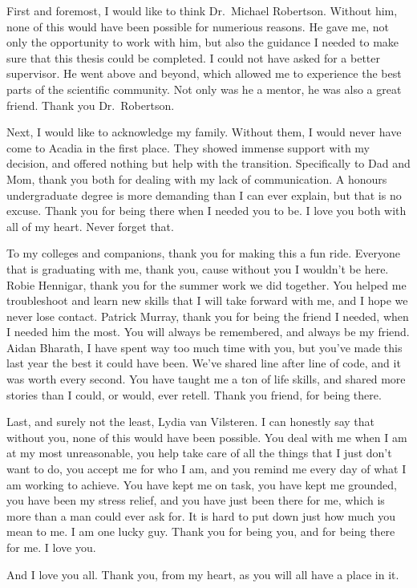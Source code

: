 \newpage
	

    First and foremost, I would like to think Dr.\ Michael Robertson. Without him, 
    none of this would have been possible for numerious reasons. He gave me, not 
    only the opportunity to work with him, but also the guidance I needed to make 
    sure that this thesis could be completed. I could not have asked for a better
    supervisor. He went above and beyond, which allowed me to experience the best parts
    of the scientific community. Not only was he a mentor, he was also a great friend.
    Thank you Dr.\ Robertson.

    Next, I would like to acknowledge my family. Without them, I would never have come to
    Acadia in the first place. They showed immense support with my decision, and offered
    nothing but help with the transition. Specifically to Dad and Mom, thank you both for
    dealing with my lack of communication. A honours undergraduate degree is more demanding
    than I can ever explain, but that is no excuse. Thank you for being there when I needed
    you to be. I love you both with all of my heart. Never forget that.

    To my colleges and companions, thank you for making this a fun ride. Everyone that is
    graduating with me, thank you, cause without you I wouldn't be here.
    Robie Hennigar, thank you for the summer work we did together. You helped me troubleshoot
    and learn new skills that I will take forward with me, and I hope we never lose contact.
    Patrick Murray, thank you for being the friend I needed, when I needed him the most. You
    will always be remembered, and always be my friend.
    Aidan Bharath, I have spent way too much time with you, but you've made this last year
    the best it could have been. We've shared line after line of code, and it was worth 
    every second. You have taught me a ton of life skills, and shared more stories than
    I could, or would, ever retell. Thank you friend, for being there.

    Last, and surely not the least, Lydia van Vilsteren. I can honestly say that without
    you, none of this would have been possible. You deal with me when I am at my most
    unreasonable, you help take care of all the things that I just don't want to do,
    you accept me for who I am,
    and you remind me every day of what I am working to achieve. You have kept me on task,
    you have kept me grounded,
    you have been my stress relief, and you have just been there for me, which is more than
    a man could ever ask for. It is hard to put down just how much you mean to me.
    I am one lucky guy. Thank you for being you, and for being 
    there for me. I love you.

    And I love you all. Thank you, from my heart, as you will all have a place
    in it.

\afterpreface
